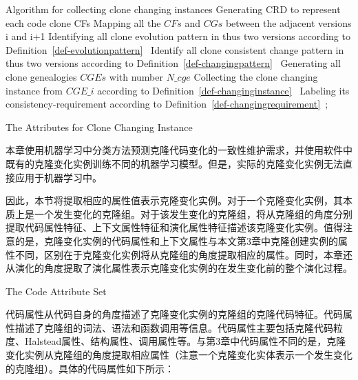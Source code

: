 \vspace{1em}
\begin{minipage}{0.8\textwidth}
\centering
\begin{algorithm}[H]
 {Algorithm for collecting clone changing instances}
\label{alg-collectionchanging}
{ 
 Generating CRD to represent each code clone {CFs}\;
 Mapping all the $CFs$ and $CGs$ between the adjacent versions {i} and {i+1}\;
 Identifying all clone evolution pattern in thus two versions according to Definition~\ref{def-evolutionpattern}~\;
 Identify all clone consistent change pattern in thus two versions according to Definition~\ref{def-changingpattern}~\;
}
Generating all clone genealogies $CGEs$ with number $N\_cge$\;
{ 
 Collecting the clone changing instance from $CGE\_i$ according to Definition~\ref{def-changinginstance}~\; 
 Labeling its consistency-requirement according to Definition~\ref{def-changingrequirement}~;
}
\end{algorithm}
\end{minipage}

{The Attributes for Clone Changing Instance}
\label{lab-changingattribute}

本章使用机器学习中分类方法预测克隆代码变化的一致性维护需求，并使用软件中既有的克隆变化实例训练不同的机器学习模型。但是，实际的克隆变化实例无法直接应用于机器学习中。

因此，本节将提取相应的属性值表示克隆变化实例。对于一个克隆变化实例，其本质上是一个发生变化的克隆组。对于该发生变化的克隆组，将从克隆组的角度分别提取代码属性特征、上下文属性特征和演化属性特征描述该克隆变化实例。值得注意的是，克隆变化实例的代码属性和上下文属性与本文第3章中克隆创建实例的属性不同，区别在于克隆变化实例将从克隆组的角度提取相应的属性。同时，本章还从演化的角度提取了演化属性表示克隆变化实例的在发生变化前的整个演化过程。

{The Code Attribute Set}

代码属性从代码自身的角度描述了克隆变化实例的克隆组的克隆代码特征。代码属性描述了克隆组的词法、语法和函数调用等信息。代码属性主要包括克隆代码粒度、Halstead属性、结构属性、调用属性等。与第3章中代码属性不同的是，克隆变化实例从克隆组的角度提取相应属性（注意一个克隆变化实体表示一个发生变化的克隆组）。具体的代码属性如下所示：

